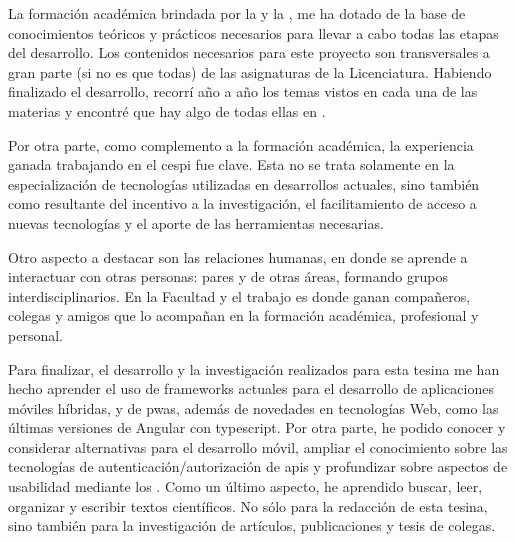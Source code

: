 La formación académica brindada por la \unlp{} y la \facultad{}, me ha dotado de la base de conocimientos teóricos y prácticos necesarios para llevar a cabo todas las etapas del desarrollo. Los contenidos necesarios para este proyecto son transversales a gran parte (si no es que todas) de las asignaturas de la Licenciatura. Habiendo finalizado el desarrollo, recorrí año a año los temas vistos en cada una de las materias y encontré que hay algo de todas ellas en \nombreApp{}. 

Por otra parte, como complemento a la formación académica, la experiencia ganada trabajando en el \gls{cespi} fue clave. Esta no se trata solamente en la especialización de tecnologías utilizadas en desarrollos actuales, sino también como resultante del incentivo a la investigación, el facilitamiento de acceso a nuevas tecnologías y el aporte de las herramientas necesarias. 

Otro aspecto a destacar son las relaciones humanas, en donde se aprende a interactuar con otras personas: pares y de otras áreas, formando grupos interdisciplinarios. En la Facultad y el trabajo es donde ganan compañeros, colegas y amigos que lo acompañan en la formación académica, profesional y personal.

Para finalizar, el desarrollo y la investigación realizados para esta tesina me han hecho aprender el uso de \glspl{framework} actuales para el desarrollo de aplicaciones móviles híbridas, y de \glspl{pwa}, además de novedades en tecnologías Web, como las últimas versiones de Angular con \gls{typescript}. Por otra parte, he podido conocer y considerar alternativas para el desarrollo móvil, ampliar el conocimiento sobre las tecnologías de autenticación/autorización de \glspl{api} y profundizar sobre aspectos de usabilidad mediante los . Como un último aspecto, he aprendido buscar, leer, organizar y escribir textos científicos. No sólo para la redacción de esta tesina, sino también para la investigación de artículos, publicaciones y tesis de colegas.
